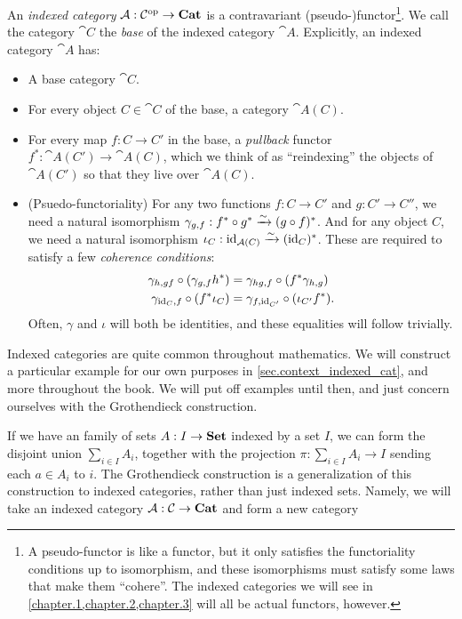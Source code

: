\documentclass[DynamicalBook]{subfiles}
\begin{document}
{\begin{definition}
  An \emph{indexed category} $\mathcal{A} : \mathcal{C}^{\textnormal{op}} \to \textbf{Cat}$ is a
  contravariant (pseudo-)functor\footnote{A pseudo-functor is like a functor,
    but it only satisfies the functoriality conditions up to isomorphism, and
    these isomorphisms must satisfy some laws that make them ``cohere''. The
    indexed categories we will see in \cref{chapter.1,chapter.2,chapter.3}
    will all be actual functors, however.}. We call the category $\cat{C}$ the
  \emph{base} of the indexed category $\cat{A}$. Explicitly, an indexed
  category $\cat{A}$ has:
  \begin{itemize}
  \item A base category $\cat{C}$.
  \item For every object $C \in \cat{C}$ of the base, a category $\cat{A}(C)$.
  \item For every map $f : C \to C'$ in the base, a \emph{pullback} functor
    $f^{\ast} : \cat{A}(C') \to \cat{A}(C)$, which we think of as ``reindexing''
    the objects of $\cat{A}(C')$ so that they live over $\cat{A}(C)$.
  \item (Psuedo-functoriality) For any two functions $f : C \to C'$ and $g : C' \to C''$, we need a
    natural isomorphism $\gamma_{g, f} : f^{\ast} \circ g^{\ast} \xrightarrow{\sim} (g \circ
    f)^{\ast}$. And for any object $C$, we need a natural isomorphism $\iota_C :
    \mathrm{id}_{\mathcal{A}(C)} \xrightarrow{\sim} (\mathrm{id}_C)^{\ast}$. These are required to satisfy a
    few \emph{coherence conditions}:
\begin{align}
  \gamma_{h,gf} \circ (\gamma_{g, f}h^{\ast}) &= \gamma_{hg, f} \circ (f^{\ast}\gamma_{h, g}) \\
  \gamma_{\mathrm{id}_C, f} \circ (f^{\ast}\iota_C) &= \gamma_{f, \mathrm{id}_{C'}} \circ (\iota_{C'} f^{\ast}).
\end{align}
   Often, $\gamma$ and $\iota$ will both be identities, and these equalities
   will follow trivially.
  \end{itemize}
\end{definition}

Indexed categories are quite common throughout mathematics. We will construct a
particular example for our own purposes in \cref{sec.context_indexed_cat}, and
more throughout the book. We will put off examples until then, and just concern
ourselves with the Grothendieck construction.

If we have an family of sets $A : I \to \textbf{Set}$ indexed by a set $I$, we can
form the disjoint union $\sum_{i \in I} A_i$, together with the projection $\pi
: \sum_{i \in I} A_i \to I$ sending each $a \in A_i$ to $i$. The Grothendieck
construction is a generalization of this construction to indexed categories,
rather than just indexed sets. Namely, we will take an indexed category $\mathcal{A}
: \mathcal{C} \to \textbf{Cat}$ and form a new category

}
\end{document}
